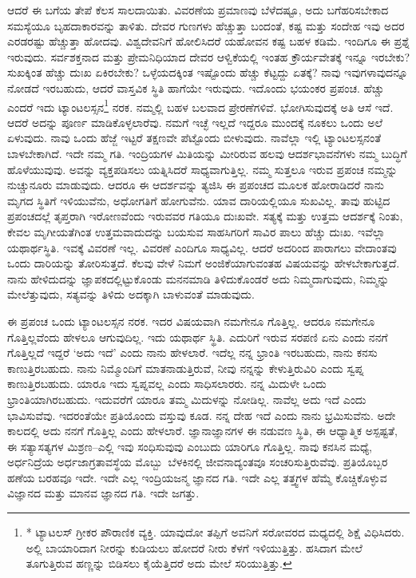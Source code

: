 ಆದರೆ ಈ ಬಗೆಯ ತೇಪೆ ಕೆಲಸ ಸಾಲದಾಯಿತು. ವಿವರಣೆಯ ಪ್ರಮಾಣವು ಬೆಳೆದಷ್ಟೂ, ಅದು ಬಗೆಹರಿಸಬೇಕಾದ ಸಮಸ್ಯೆಯೂ ಬೃಹದಾಕಾರವನ್ನು ತಾಳಿತು. ದೇವರ ಗುಣಗಳು ಹೆಚ್ಚುತ್ತಾ ಬಂದಂತೆ, ಕಷ್ಟ ಮತ್ತು ಸಂದೇಹ ಇವು ಅದರ ಎರಡರಷ್ಟು ಹೆಚ್ಚುತ್ತಾ ಹೋದವು. ವಿಶ್ವದೇವನಿಗೆ ಹೋಲಿಸಿದರೆ ಯಹೋವನ ಕಷ್ಟ ಬಹಳ ಕಡಿಮೆ. ಇಂದಿಗೂ ಈ ಪ್ರಶ್ನೆ ಇರುವುದು. ಸರ್ವಶಕ್ತನಾದ ಮತ್ತು ಪ್ರೇಮನಿಧಿಯಾದ ದೇವರ ಆಳ್ವಿಕೆಯಲ್ಲಿ ಇಂತಹ ಕ್ರೌರ್ಯವೇತಕ್ಕೆ ಇನ್ನೂ ಇರಬೇಕು? ಸುಖಕ್ಕಿಂತ ಹೆಚ್ಚು ದುಃಖ ಏಕಿರಬೇಕು? ಒಳ್ಳೆಯದಕ್ಕಿಂತ ಇಷ್ಟೊಂದು ಹೆಚ್ಚು ಕೆಟ್ಟದ್ದು ಏತಕ್ಕೆ? ನಾವು ಇವುಗಳಾವುದನ್ನೂ ನೋಡದೆ ಇರಬಹುದು, ಆದರೆ ವಾಸ್ತವಿಕ ಸ್ಥಿತಿ ಹಾಗೆಯೇ ಇರುವುದು. ಇದೊಂದು ಭಯಂಕರ ಪ್ರಪಂಚ. ಹೆಚ್ಚು ಎಂದರೆ ಇದು ಟ್ಯಾಂಟಲಸ್ಸನ\footnote{* ಟ್ಯಾಟಲಸ್​ ಗ್ರೀಕರ ಪೌರಾಣಿಕ ವ್ಯಕ್ತಿ. ಯಾವುದೋ ತಪ್ಪಿಗೆ ಅವನಿಗೆ ಸರೋವರದ ಮಧ್ಯದಲ್ಲಿ ಶಿಕ್ಷೆ ವಿಧಿಸಿದರು. ಅಲ್ಲಿ ಬಾಯಾರಿದಾಗ ನೀರನ್ನು ಕುಡಿಯಲು ಹೋದರೆ ನೀರು ಕೆಳಗೆ ಇಳಿಯುತ್ತಿತ್ತು. ಹಸಿದಾಗ ಮೇಲೆ ತೂಗುತ್ತಿರುವ ಹಣ್ಣನ್ನು ಬಿಡಿಸಲು ಕೈಯೆತ್ತಿದರೆ ಅದು ಮೇಲೆ ಸರಿಯುತ್ತಿತ್ತು.} ನರಕ. ನಮ್ಮಲ್ಲಿ ಬಹಳ ಬಲವಾದ ಪ್ರೇರಣೆಗಳಿವೆ. ಭೋಗಿಸುವುದಕ್ಕೆ ಅತಿ ಆಸೆ ಇದೆ. ಆದರೆ ಅದನ್ನು ಪೂರ್ಣ ಮಾಡಿಕೊಳ್ಳಲಾರೆವು. ನಮಗೆ ಇಚ್ಛೆ ಇಲ್ಲದೆ ಇದ್ದರೂ ಮುಂದಕ್ಕೆ ನೂಕಲು ಒಂದು ಅಲೆ ಏಳುವುದು. ನಾವು ಒಂದು ಹೆಜ್ಜೆ ಇಟ್ಟರೆ ತಕ್ಷಣವೇ ಪೆಟ್ಟೊಂದು ಬೀಳುವುದು. ನಾವೆಲ್ಲಾ ಇಲ್ಲಿ ಟ್ಯಾಂಟಲಸ್ಸನಂತೆ ಬಾಳಬೇಕಾಗಿದೆ. ಇದೇ ನಮ್ಮ ಗತಿ. ಇಂದ್ರಿಯಗಳ ಮಿತಿಯನ್ನು ಮೀರಿರುವ ಹಲವು ಆದರ್ಶಭಾವನೆಗಳು ನಮ್ಮ ಬುದ್ಧಿಗೆ ಹೊಳೆಯುವುವು. ಅವನ್ನು ವ್ಯಕ್ತಪಡಿಸಲು ಯತ್ನಿಸಿದರೆ ಸಾಧ್ಯವಾಗುತ್ತಿಲ್ಲ. ನಮ್ಮ ಸುತ್ತಲೂ ಇರುವ ಪ್ರಪಂಚ ನಮ್ಮನ್ನು ನುಚ್ಚುನೂರು ಮಾಡುವುದು. ಆದರೂ ಈ ಆದರ್ಶವನ್ನು ತ್ಯಜಿಸಿ ಈ ಪ್ರಪಂಚದ ಮೂಲಕ ಹೋರಾಡಿದರೆ ನಾನು ಮೃಗದ ಸ್ಥಿತಿಗೆ ಇಳಿಯುವೆನು, ಅಧೋಗತಿಗೆ ಹೋಗುವೆನು. ಯಾವ ದಾರಿಯಲ್ಲಿಯೂ ಸುಖವಿಲ್ಲ. ತಾವು ಹುಟ್ಟಿದ ಪ್ರಪಂಚದಲ್ಲೆ ತೃಪ್ತರಾಗಿ ಇರೋಣವೆಂದು ಇರುವವರ ಗತಿಯೂ ದುಃಖವೇ. ಸತ್ಯಕ್ಕೆ ಮತ್ತು ಉತ್ತಮ ಆದರ್ಶಕ್ಕೆ ನಿಂತು, ಕೇವಲ ಮೃಗೀಯತೆಗಿಂತ ಉತ್ತಮವಾದುದನ್ನು ಬಯಸುವ ಸಾಹಸಿಗರಿಗೆ ಸಾವಿರ ಪಾಲು ಹೆಚ್ಚು ದುಃಖ. ಇವೆಲ್ಲಾ ಯಥಾರ್ಥಸ್ಥಿತಿ. ಇವಕ್ಕೆ ವಿವರಣೆ ಇಲ್ಲ. ವಿವರಣೆ ಎಂದಿಗೂ ಸಾಧ್ಯವಿಲ್ಲ. ಆದರೆ ಅದರಿಂದ ಪಾರಾಗಲು ವೇದಾಂತವು ಒಂದು ದಾರಿಯನ್ನು ತೋರಿಸುತ್ತದೆ. ಕೆಲವು ವೇಳೆ ನಿಮಗೆ ಅಂಜಿಕೆಯಾಗುವಂತಹ ವಿಷಯವನ್ನು ಹೇಳಬೇಕಾಗುತ್ತದೆ. ನಾನು ಹೇಳಿದುದನ್ನು ಜ್ಞಾಪಕದಲ್ಲಿಟ್ಟುಕೊಂಡು ಮನನಮಾಡಿ ತಿಳಿದುಕೊಂಡರೆ ಅದು ನಿಮ್ಮದಾಗುವುದು, ನಿಮ್ಮನ್ನು ಮೇಲೆತ್ತುವುದು, ಸತ್ಯವನ್ನು ತಿಳಿದು ಅದಕ್ಕಾಗಿ ಬಾಳುವಂತೆ ಮಾಡುವುದು.


ಈ ಪ್ರಪಂಚ ಒಂದು ಟ್ಯಾಂಟಲಸ್ಸನ ನರಕ. ಇದರ ವಿಷಯವಾಗಿ ನಮಗೇನೂ ಗೊತ್ತಿಲ್ಲ. ಆದರೂ ನಮಗೇನೂ ಗೊತ್ತಿಲ್ಲವೆಂದು ಹೇಳಲೂ ಆಗುವುದಿಲ್ಲ. ಇದು ಯಥಾರ್ಥ ಸ್ಥಿತಿ. ಎದುರಿಗೆ ಇರುವ ಸರಪಣಿ ಏನು ಎಂದು ನನಗೆ ಗೊತ್ತಿಲ್ಲದೆ ಇದ್ದರೆ ‘ಅದು ಇದೆ’ ಎಂದು ನಾನು ಹೇಳಲಾರೆ. ಇದೆಲ್ಲ ನನ್ನ ಭ್ರಾಂತಿ ಇರಬಹುದು, ನಾನು ಕನಸು ಕಾಣುತ್ತಿರಬಹುದು. ನಾನು ನಿಮ್ಮೊಂದಿಗೆ ಮಾತನಾಡುತ್ತಿರುವೆ, ನೀವು ನನ್ನನ್ನು ಕೇಳುತ್ತಿರುವಿರಿ ಎಂದು ಸ್ವಪ್ನ ಕಾಣುತ್ತಿರಬಹುದು. ಯಾರೂ ಇದು ಸ್ವಪ್ನವಲ್ಲ ಎಂದು ಸಾಧಿಸಲಾರರು. ನನ್ನ ಮಿದುಳೇ ಒಂದು ಭ್ರಾಂತಿಯಾಗಿರಬಹುದು. ಇದುವರೆಗೆ ಯಾರೂ ತಮ್ಮ ಮಿದುಳನ್ನು ನೋಡಿಲ್ಲ. ನಾವೆಲ್ಲ ಅದು ಇದೆ ಎಂದು ಭಾವಿಸುವೆವು. ಇದರಂತೆಯೇ ಪ್ರತಿಯೊಂದು ವಸ್ತುವು ಕೂಡ. ನನ್ನ ದೇಹ ಇದೆ ಎಂದು ನಾನು ಭ್ರಮಿಸುವೆನು. ಅದೇ ಕಾಲದಲ್ಲಿ ಅದು ನನಗೆ ಗೊತ್ತಿಲ್ಲ ಎಂದು ಹೇಳಲಾರೆ. ಜ್ಞಾನಾಜ್ಞಾನಗಳ ಈ ನಡುವಣ ಸ್ಥಿತಿ, ಈ ಆಧ್ಯಾತ್ಮಿಕ ಅಸ್ಪಷ್ಟತೆ, ಈ ಸತ್ಯಾಸತ್ಯಗಳ ಮಿಶ್ರಣ–ಎಲ್ಲಿ ಇವು ಸಂಧಿಸುವುವು ಎಂಬುದು ಯಾರಿಗೂ ಗೊತ್ತಿಲ್ಲ. ನಾವು ಕನಸಿನ ಮಧ್ಯೆ, ಅರ್ಧನಿದ್ರೆಯ ಅರ್ಧಜಾಗ್ರತಾವಸ್ಥೆಯ ಮೊಬ್ಬು\break\ ಬೆಳಕಿನಲ್ಲಿ ಜೀವನಾದ್ಯಂತವೂ ಸಂಚರಿಸುತ್ತಿರುವೆವು. ಪ್ರತಿಯೊಬ್ಬರ ಹಣೆಯ ಬರಹವೂ ಇದೇ. ಇದೇ ಎಲ್ಲ ಇಂದ್ರಿಯಜನ್ಮ ಜ್ಞಾನದ ಗತಿ. ಇದೇ ಎಲ್ಲ ತತ್ತ್ವಗಳ ಹೆಮ್ಮೆ ಕೊಚ್ಚಿಕೊಳ್ಳುವ ವಿಜ್ಞಾನದ ಮತ್ತು ಮಾನವ ಜ್ಞಾನದ ಗತಿ. ಇದೇ ಜಗತ್ತು.

